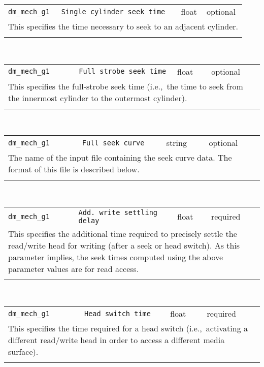 \noindent 
\begin{tabular}{|p{\lpmodwidth}|p{\lpnamewidth}|p{0.5in}|p{0.5in}|}
\cline{1-4}
\texttt{dm\_mech\_g1} & \texttt{Single cylinder seek time} & float & optional \\ 
\cline{1-4}
\multicolumn{4}{|p{6in}|}{
This specifies the time necessary to seek to an adjacent cylinder.
}\\ 
\cline{1-4}
\multicolumn{4}{p{5in}}{}\\
\end{tabular}\\ 
\noindent 
\begin{tabular}{|p{\lpmodwidth}|p{\lpnamewidth}|p{0.5in}|p{0.5in}|}
\cline{1-4}
\texttt{dm\_mech\_g1} & \texttt{Full strobe seek time} & float & optional \\ 
\cline{1-4}
\multicolumn{4}{|p{6in}|}{
This specifies the full-strobe seek time (i.e.,~the time to seek from the
innermost cylinder to the outermost cylinder).
}\\ 
\cline{1-4}
\multicolumn{4}{p{5in}}{}\\
\end{tabular}\\ 
\noindent 
\begin{tabular}{|p{\lpmodwidth}|p{\lpnamewidth}|p{0.5in}|p{0.5in}|}
\cline{1-4}
\texttt{dm\_mech\_g1} & \texttt{Full seek curve} & string & optional \\ 
\cline{1-4}
\multicolumn{4}{|p{6in}|}{
The name of the input file containing the seek curve data.
The format of this file is described below.
}\\ 
\cline{1-4}
\multicolumn{4}{p{5in}}{}\\
\end{tabular}\\ 
\noindent 
\begin{tabular}{|p{\lpmodwidth}|p{\lpnamewidth}|p{0.5in}|p{0.5in}|}
\cline{1-4}
\texttt{dm\_mech\_g1} & \texttt{Add. write settling delay} & float & required \\ 
\cline{1-4}
\multicolumn{4}{|p{6in}|}{
This specifies the additional time required to precisely settle the
read/write head for writing (after a seek or head switch). As this
parameter implies, the seek times computed using the above parameter
values are for read access.
}\\ 
\cline{1-4}
\multicolumn{4}{p{5in}}{}\\
\end{tabular}\\ 
\noindent 
\begin{tabular}{|p{\lpmodwidth}|p{\lpnamewidth}|p{0.5in}|p{0.5in}|}
\cline{1-4}
\texttt{dm\_mech\_g1} & \texttt{Head switch time} & float & required \\ 
\cline{1-4}
\multicolumn{4}{|p{6in}|}{
This specifies the time required for a head switch (i.e.,~activating a
different read/write head in order to access a different media
surface).
}\\ 
\cline{1-4}
\multicolumn{4}{p{5in}}{}\\
\end{tabular}\\ 
